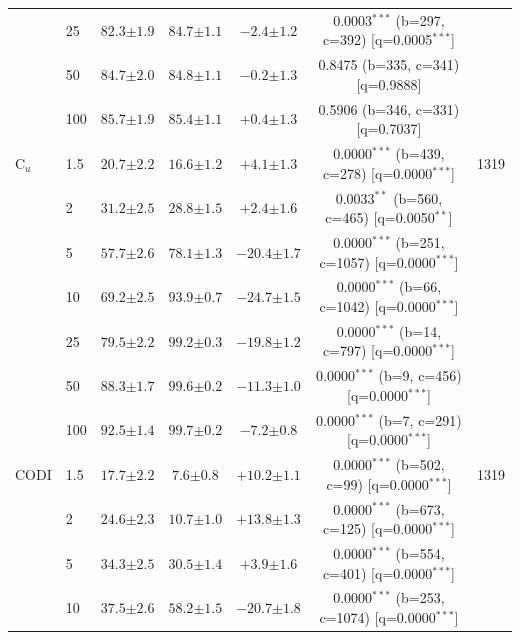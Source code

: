 \begin{table}[h!]
\begin{tabular}{l l cccc c}
 & 25 & $82.3 {\scriptstyle \pm 1.9}$ & $84.7 {\scriptstyle \pm 1.1}$ & $-2.4 {\scriptstyle \pm 1.2}$ & 0.0003$^{***}$ (b=297, c=392) [q=0.0005$^{***}$] &  \\
 & 50 & $84.7 {\scriptstyle \pm 2.0}$ & $84.8 {\scriptstyle \pm 1.1}$ & $-0.2 {\scriptstyle \pm 1.3}$ & 0.8475 (b=335, c=341) [q=0.9888] &  \\
 & 100 & $85.7 {\scriptstyle \pm 1.9}$ & $85.4 {\scriptstyle \pm 1.1}$ & $+0.4 {\scriptstyle \pm 1.3}$ & 0.5906 (b=346, c=331) [q=0.7037] &  \\
\midrule
C$_u$ & 1.5 & $20.7 {\scriptstyle \pm 2.2}$ & $16.6 {\scriptstyle \pm 1.2}$ & $+4.1 {\scriptstyle \pm 1.3}$ & 0.0000$^{***}$ (b=439, c=278) [q=0.0000$^{***}$] & 1319 \\
 & 2 & $31.2 {\scriptstyle \pm 2.5}$ & $28.8 {\scriptstyle \pm 1.5}$ & $+2.4 {\scriptstyle \pm 1.6}$ & 0.0033$^{**}$ (b=560, c=465) [q=0.0050$^{**}$] &  \\
 & 5 & $57.7 {\scriptstyle \pm 2.6}$ & $78.1 {\scriptstyle \pm 1.3}$ & $-20.4 {\scriptstyle \pm 1.7}$ & 0.0000$^{***}$ (b=251, c=1057) [q=0.0000$^{***}$] &  \\
 & 10 & $69.2 {\scriptstyle \pm 2.5}$ & $93.9 {\scriptstyle \pm 0.7}$ & $-24.7 {\scriptstyle \pm 1.5}$ & 0.0000$^{***}$ (b=66, c=1042) [q=0.0000$^{***}$] &  \\
 & 25 & $79.5 {\scriptstyle \pm 2.2}$ & $99.2 {\scriptstyle \pm 0.3}$ & $-19.8 {\scriptstyle \pm 1.2}$ & 0.0000$^{***}$ (b=14, c=797) [q=0.0000$^{***}$] &  \\
 & 50 & $88.3 {\scriptstyle \pm 1.7}$ & $99.6 {\scriptstyle \pm 0.2}$ & $-11.3 {\scriptstyle \pm 1.0}$ & 0.0000$^{***}$ (b=9, c=456) [q=0.0000$^{***}$] &  \\
 & 100 & $92.5 {\scriptstyle \pm 1.4}$ & $99.7 {\scriptstyle \pm 0.2}$ & $-7.2 {\scriptstyle \pm 0.8}$ & 0.0000$^{***}$ (b=7, c=291) [q=0.0000$^{***}$] &  \\
\midrule
CODI & 1.5 & $17.7 {\scriptstyle \pm 2.2}$ & $7.6 {\scriptstyle \pm 0.8}$ & $+10.2 {\scriptstyle \pm 1.1}$ & 0.0000$^{***}$ (b=502, c=99) [q=0.0000$^{***}$] & 1319 \\
 & 2 & $24.6 {\scriptstyle \pm 2.3}$ & $10.7 {\scriptstyle \pm 1.0}$ & $+13.8 {\scriptstyle \pm 1.3}$ & 0.0000$^{***}$ (b=673, c=125) [q=0.0000$^{***}$] &  \\
 & 5 & $34.3 {\scriptstyle \pm 2.5}$ & $30.5 {\scriptstyle \pm 1.4}$ & $+3.9 {\scriptstyle \pm 1.6}$ & 0.0000$^{***}$ (b=554, c=401) [q=0.0000$^{***}$] &  \\
 & 10 & $37.5 {\scriptstyle \pm 2.6}$ & $58.2 {\scriptstyle \pm 1.5}$ & $-20.7 {\scriptstyle \pm 1.8}$ & 0.0000$^{***}$ (b=253, c=1074) [q=0.0000$^{***}$] &  \\

\end{tabular}
\end{table}
